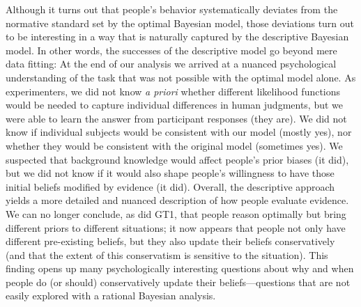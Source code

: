 \documentclass[doc,floatsintext]{apa6}
\begin{document}
Although it turns out that people's behavior systematically deviates from the normative standard set by the optimal Bayesian model, those deviations turn out to be interesting in a way that is naturally captured by the descriptive Bayesian model. In other words, the successes of the descriptive model go beyond mere data fitting: At the end of our analysis we arrived at a nuanced psychological understanding of the task that was not possible with the optimal model alone. As experimenters, we did not know {\it a priori} whether different likelihood functions would be needed to capture individual differences in human judgments, but we were able to learn the answer from participant responses (they are). We did not know if individual subjects would be consistent with our model (mostly yes), nor whether they would be consistent with the original model (sometimes yes). We suspected that background knowledge would affect people's prior biases (it did), but we did not know if it would also shape people's willingness to have those initial beliefs modified by evidence (it did). Overall, the descriptive approach yields a more detailed and nuanced description of how people evaluate evidence. We can no longer conclude, as did GT1, that people reason optimally but bring different priors to different situations; it now appears that people not only have different pre-existing beliefs, but they also update their beliefs conservatively (and that the extent of this conservatism is sensitive to the situation). This finding opens up many psychologically interesting questions about why and when people do (or should) conservatively update their beliefs---questions that are not easily explored with a rational Bayesian analysis.
\end{document}
